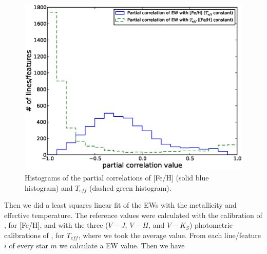 \documentclass[referee]{aa}
\begin{document}
\begin{figure}[h]
\begin{center}
\includegraphics[scale=0.45]{pics/pcorrv2.eps}
\end{center}
\caption{Histograms of the partial correlations of [Fe/H] (solid blue histogram) and $T_{eff}$ (dashed green histogram).}
\label{fig:pcorr}
\end{figure}


Then we did a least squares linear fit of the EWs with the metallicity and effective temperature. The reference values were calculated with the calibration of \citet{Neves-2012}, for [Fe/H], and with the three ($V-J$, $V-H$, and $V-K_{S}$) photometric calibrations of \citet{Casagrande-2008}, for $T_{eff}$, where we took the average value. From each line/feature $i$ of every star $m$ we calculate a EW value. Then we have
\end{document}
